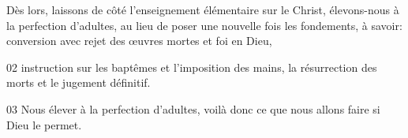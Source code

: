 Dès lors, laissons de côté l’enseignement élémentaire sur le Christ, élevons-nous à la perfection d’adultes, au lieu de poser une nouvelle fois les fondements, à savoir: conversion avec rejet des œuvres mortes et foi en Dieu,

02 instruction sur les baptêmes et l’imposition des mains, la résurrection des morts et le jugement définitif.

03 Nous élever à la perfection d’adultes, voilà donc ce que nous allons faire si Dieu le permet.
